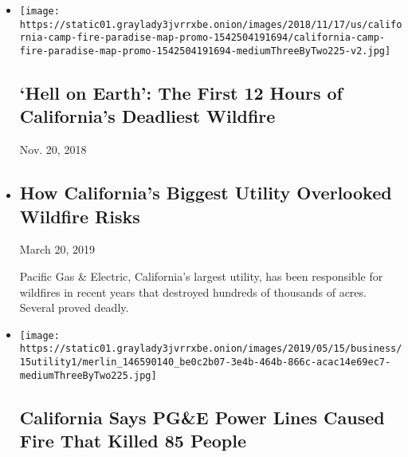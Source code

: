 \begin{itemize}
\item
  \href{https://www.nytimes3xbfgragh.onion/interactive/2018/11/18/us/california-camp-fire-paradise.html}{}

  \texttt{[image: https://static01.graylady3jvrrxbe.onion/images/2018/11/17/us/california-camp-fire-paradise-map-promo-1542504191694/california-camp-fire-paradise-map-promo-1542504191694-mediumThreeByTwo225-v2.jpg]}

  \hypertarget{hell-on-earth-the-first-12-hours-of-californias-deadliest-wildfire}{%
  \subsection{`Hell on Earth': The First 12 Hours of California's
  Deadliest
  Wildfire}\label{hell-on-earth-the-first-12-hours-of-californias-deadliest-wildfire}}

  Nov. 20, 2018
\item
  \href{https://www.nytimes3xbfgragh.onion/interactive/2019/03/18/business/pge-california-wildfires.html}{}

  \hypertarget{how-californias-biggest-utility-overlooked-wildfire-risks}{%
  \subsection{How California's Biggest Utility Overlooked Wildfire
  Risks}\label{how-californias-biggest-utility-overlooked-wildfire-risks}}

  March 20, 2019

  Pacific Gas \& Electric, California's largest utility, has been
  responsible for wildfires in recent years that destroyed hundreds of
  thousands of acres. Several proved deadly.
\item
  \href{https://www.nytimes3xbfgragh.onion/2019/05/15/business/pge-fire.html}{}

  \texttt{[image: https://static01.graylady3jvrrxbe.onion/images/2019/05/15/business/15utility1/merlin\_146590140\_be0c2b07-3e4b-464b-866c-acac14e69ec7-mediumThreeByTwo225.jpg]}

  \hypertarget{california-says-pge-power-lines-caused-fire-that-killed-85-people}{%
  \subsection{California Says PG\&E Power Lines Caused Fire That Killed
  85
  People}\label{california-says-pge-power-lines-caused-fire-that-killed-85-people}}


\end{itemize}
